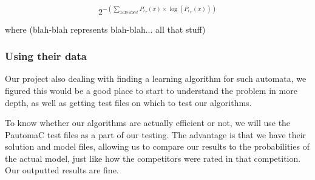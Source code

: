 \[
2^{-(\sum_{x\epsilon TestSet}P_{r_{T}}(x)\times\log(P_{r_{C}}(x)))}
\]


where (blah-blah represents blah-blah... all that stuff)


\subsubsection{Using their data}

Our project also dealing with finding a learning algorithm for such
automata, we figured this would be a good place to start to understand
the problem in more depth, as well as getting test files on which
to test our algorithms.

To know whether our algorithms are actually efficient or not, we will
use the PautomaC test files as a part of our testing. The advantage
is that we have their solution and model files, allowing us to compare
our results to the probabilities of the actual model, just like how
the competitors were rated in that competition. Our outputted results
are fine.